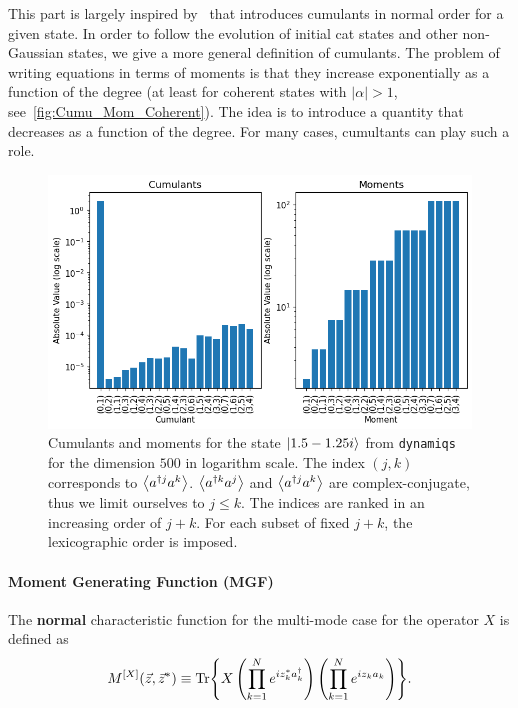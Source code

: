 This part is largely inspired by~\cite{khan2021physical} that introduces cumulants in normal order for a given state. In order to follow the evolution of initial cat states and other non-Gaussian states, we give a more general definition of cumulants. The problem of writing equations in terms of moments is that they increase exponentially as a function of the degree (at least for coherent states with $|\alpha| > 1$, see~\autoref{fig:Cumu_Mom_Coherent}). The idea is to introduce a quantity that decreases as a function of the degree. For many cases, cumultants can play such a role.
\begin{center}
    \begin{figure}[h!]
      \centering
      \includegraphics[width=0.9\linewidth]{Pics/Cumu_Mom_Coherent.pdf}
      \caption{Cumulants and moments for the state $\ket{1.5-1.25i}$ from \texttt{dynamiqs} \cite{dynamiqs} for the dimension $500$ in logarithm scale. The index $(j, k)$ corresponds to $\left\langle a^{\dagger j} a^k \right\rangle$. $\left\langle a^{\dagger k} a^j \right\rangle$ and $\left\langle a^{\dagger j} a^k \right\rangle$ are complex-conjugate, thus we limit ourselves to $j \le k$. The indices are ranked in an increasing order of $j+k$. For each subset of fixed $j+k$, the lexicographic order is imposed.}
      \label{fig:Cumu_Mom_Coherent}
    \end{figure}
\end{center}

\paragraph{Moment Generating Function (MGF)} The \textbf{normal} characteristic function for the multi-mode case for the operator $X$ is defined as \cite{explo_quant, khan2021physical}
\begin{equation}
    M^{[X]}(\Vec{z}, \Vec{z}^*) \equiv \Tr{X \left(\prod_{k=1}^N e^{i z^*_k a^\dagger_k}\right) \left(\prod_{k=1}^N e^{i z_k a_k}\right)}.
\end{equation}

